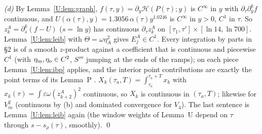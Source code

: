 \documentclass[11pt]{article}
\newcommand{\fn}[1]{\texttt{\detokenize{#1}}}
\begin{document}
\emph{(d)} By Lemma~\ref{U:lem:graph}, $f(\tau,y)=\partial_y\mathcal H(P(\tau);y)$ is $C^\infty$ in $y$ with $\partial_\tau\partial_y^kf$ continuous, and $U(\alpha(\tau),y)=1.3056\,\alpha(\tau)y^{1.0246}$ is $C^\infty$ in $y>0$, $C^1$ in $\tau$. So $z^A_k=\partial_s^k(f-U)$ ($s=\ln y$) has continuous $\partial_\tau z^A_k$ on $[\tau_1,\tau']\times[\ln14,\ln700]$. Lemma~\ref{U:lem:leib} with $\Theta=\omega\eta_A^2$ gives $E^A_j\in C^1$. Every integration by parts in \fn{lemmaS_A_v33.tex} \S2 is of a smooth $z$-product against a coefficient that is continuous and piecewise $C^1$ (with $\eta_{\rm in},\eta_o\in C^2$, $S'''$ jumping at the ends of the ramps); on each piece Lemma~\ref{U:lem:ibp} applies, and the interior point contributions are exactly the point terms of its Lemma~P \tI. $X_k(\tau_a,T)=\int_{\tau_a}^{\tau_a+T}x_k$ with $x_k(\tau)=\int\varepsilon\omega(z^A_{k+2})^2$ continuous, so $X_k$ is continuous in $(\tau_a,T)$; likewise for $V_m^2$ (continuous by (b) and dominated convergence for $V_4$). The last sentence is Lemma~\ref{U:lem:leib} again (the window weights of Lemma~U depend on $\tau$ through $s-s_\rho(\tau)$, smoothly). \qed

\end{document}
